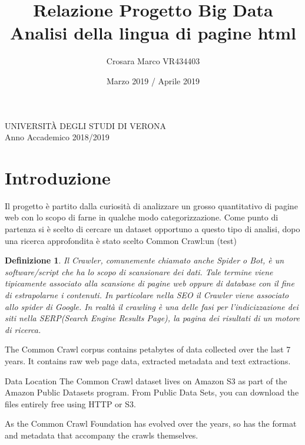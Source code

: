 \documentclass{article}
\title{Relazione Progetto Big Data\\Analisi della lingua di pagine html}
\author{Crosara Marco VR434403}
\date{Marzo 2019 / Aprile 2019}
\newtheorem*{definition}{Definizione}
\begin{document}
\maketitle
\thispagestyle{empty}

\vspace{\fill}

\begin{center}
  UNIVERSITÀ DEGLI STUDI DI VERONA\\
Anno Accademico 2018/2019
\end{center}

\newpage

\tableofcontents
\thispagestyle{empty}

\newpage


\section{Introduzione}

Il progetto è partito dalla curiosità di analizzare un grosso quantitativo di pagine web con lo scopo di farne in qualche modo categorizzazione. Come punto di partenza si è scelto di cercare un dataset opportuno a questo tipo di analisi, dopo una ricerca approfondita è stato scelto Common Crawl\cite{commoncrawl}:un (test)

\begin{definition}
Il Crawler, comunemente chiamato anche Spider o Bot, è un software/script che ha lo scopo di scansionare dei dati. Tale termine viene tipicamente associato alla scansione di pagine web oppure di database con il fine di estrapolarne i contenuti. In particolare nella SEO il Crawler viene associato allo spider di Google. In realtà il crawling è una delle fasi per l’indicizzazione dei siti nella SERP(Search Engine Results Page), la pagina dei risultati di un motore di ricerca.
\end{definition}

The Common Crawl corpus contains petabytes of data collected over the last 7 years. It contains raw web page data, extracted metadata and text extractions.

Data Location
The Common Crawl dataset lives on Amazon S3 as part of the Amazon Public Datasets program.
From Public Data Sets, you can download the files entirely free using HTTP or S3.

As the Common Crawl Foundation has evolved over the years, so has the format and metadata that accompany the crawls themselves.
\end{document}
